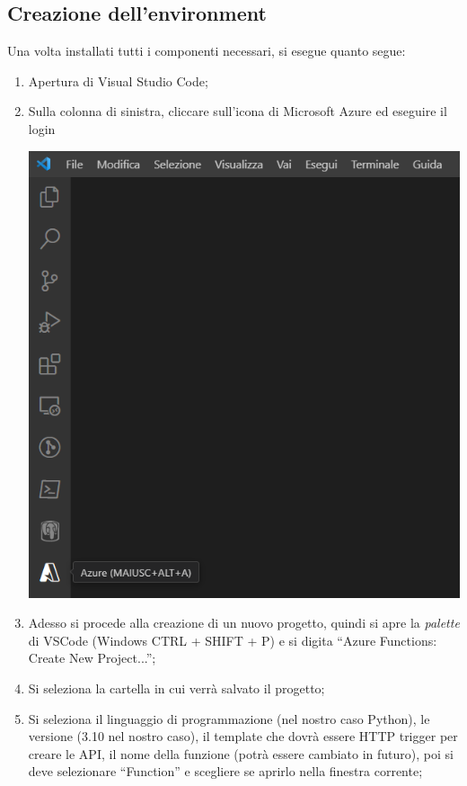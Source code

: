 \documentclass[a4paper]{article}
\newcommand{\dquotes}[1]{``#1''}
\begin{document}
	\subsection{Creazione dell'environment}
	
	Una volta installati tutti i componenti necessari, si esegue quanto segue:
	\begin{enumerate}
		\item Apertura di Visual Studio Code;
		
		\item Sulla colonna di sinistra, cliccare sull'icona di Microsoft Azure ed eseguire il login
		\begin{center}
			\centering
			\includegraphics[width=.5\textwidth]{img/azure-1.png}
		\end{center}
		
		\item Adesso si procede alla creazione di un nuovo progetto, quindi si apre la \emph{palette} di VSCode (Windows CTRL + SHIFT + P) e si digita \dquotes{\textsf{Azure Functions: Create New Project...}};
		
		\item Si seleziona la cartella in cui verrà salvato il progetto;
		
		\item Si seleziona il linguaggio di programmazione (nel nostro caso Python), le versione (3.10 nel nostro caso), il template che dovrà essere HTTP trigger per creare le API, il nome della funzione (potrà essere cambiato in futuro), poi si deve selezionare \dquotes{\textsf{Function}} e scegliere se aprirlo nella finestra corrente;
		

\end{enumerate}
\end{document}
